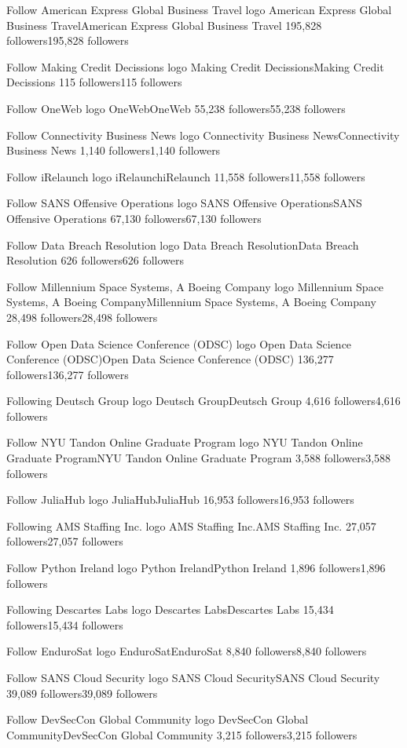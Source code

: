 Follow
American Express Global Business Travel logo
American Express Global Business TravelAmerican Express Global Business Travel
195,828 followers195,828 followers

Follow
Making Credit Decissions logo
Making Credit DecissionsMaking Credit Decissions
115 followers115 followers

Follow
OneWeb logo
OneWebOneWeb
55,238 followers55,238 followers

Follow
Connectivity Business News logo
Connectivity Business NewsConnectivity Business News
1,140 followers1,140 followers

Follow
iRelaunch logo
iRelaunchiRelaunch
11,558 followers11,558 followers

Follow
SANS Offensive Operations logo
SANS Offensive OperationsSANS Offensive Operations
67,130 followers67,130 followers

Follow
Data Breach Resolution logo
Data Breach ResolutionData Breach Resolution
626 followers626 followers

Follow
Millennium Space Systems, A Boeing Company logo
Millennium Space Systems, A Boeing CompanyMillennium Space Systems, A Boeing Company
28,498 followers28,498 followers

Follow
Open Data Science Conference (ODSC) logo
Open Data Science Conference (ODSC)Open Data Science Conference (ODSC)
136,277 followers136,277 followers

Following
Deutsch Group logo
Deutsch GroupDeutsch Group
4,616 followers4,616 followers

Follow
NYU Tandon Online Graduate Program logo
NYU Tandon Online Graduate ProgramNYU Tandon Online Graduate Program
3,588 followers3,588 followers

Follow
JuliaHub logo
JuliaHubJuliaHub
16,953 followers16,953 followers

Following
AMS Staffing Inc. logo
AMS Staffing Inc.AMS Staffing Inc.
27,057 followers27,057 followers

Follow
Python Ireland logo
Python IrelandPython Ireland
1,896 followers1,896 followers

Following
Descartes Labs logo
Descartes LabsDescartes Labs
15,434 followers15,434 followers

Follow
EnduroSat logo
EnduroSatEnduroSat
8,840 followers8,840 followers

Follow
SANS Cloud Security logo
SANS Cloud SecuritySANS Cloud Security
39,089 followers39,089 followers

Follow
DevSecCon Global Community logo
DevSecCon Global CommunityDevSecCon Global Community
3,215 followers3,215 followers

